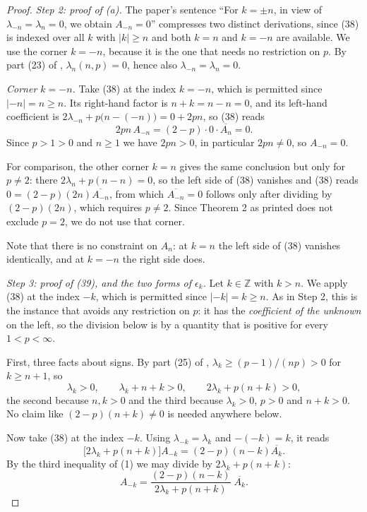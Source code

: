 \begin{proof}
\emph{Step 2: proof of (a).}  The paper's sentence ``For $k=\pm n$, in view of
$\lambda_{-n}=\lambda_n=0$, we obtain $A_{-n}=0$'' compresses two distinct
derivations, since (38) is indexed over all $k$ with $|k|\ge n$ and both $k=n$
and $k=-n$ are available.  We use the corner $k=-n$, because it is the one that
needs no restriction on $p$.  By part (23) of ,
$\lambda_n(n,p)=0$, hence also $\lambda_{-n}=\lambda_n=0$.

\emph{Corner $k=-n$.}  Take (38) at the index $k=-n$, which is permitted since
$|-n|=n\ge n$.  Its right-hand factor is $n+k=n-n=0$, and its left-hand
coefficient is $2\lambda_{-n}+p\bigl(n-(-n)\bigr)=0+2pn$, so (38) reads
\[
  2pn\,A_{-n}=(2-p)\cdot0\cdot\overline{A_{n}}=0 .
\]
Since $p>1>0$ and $n\ge1$ we have $2pn>0$, in particular $2pn\neq0$, so
$A_{-n}=0$.

For comparison, the other corner $k=n$ gives the same conclusion but only for
$p\neq2$: there $2\lambda_n+p(n-n)=0$, so the left side of (38) vanishes and
(38) reads $0=(2-p)(2n)\overline{A_{-n}}$, from which $\overline{A_{-n}}=0$
follows only after dividing by $(2-p)(2n)$, which requires $p\neq2$.  Since
Theorem 2 as printed does not exclude $p=2$, we do not use that corner.

Note that there is no constraint on $A_n$: at $k=n$ the left side of (38)
vanishes identically, and at $k=-n$ the right side does.

\emph{Step 3: proof of (39), and the two forms of $\epsilon_k$.}  Let
$k\in\mathbb{Z}$ with $k>n$.  We apply (38) at the index $-k$, which is
permitted since $|-k|=k\ge n$.  As in Step 2, this is the instance that avoids
any restriction on $p$: it has the \emph{coefficient of the unknown} on the
left, so the division below is by a quantity that is positive for every
$1<p<\infty$.

First, three facts about signs.  By part (25) of ,
$\lambda_k\ge(p-1)/(np)>0$ for $k\ge n+1$, so
\begin{equation}\tag{1}
  \lambda_k>0,\qquad \lambda_k+n+k>0,\qquad 2\lambda_k+p(n+k)>0,
\end{equation}
the second because $n,k>0$ and the third because $\lambda_k>0$, $p>0$ and
$n+k>0$.  No claim like $(2-p)(n+k)\neq0$ is needed anywhere below.

Now take (38) at the index $-k$.  Using $\lambda_{-k}=\lambda_k$ and
$-(-k)=k$, it reads
\begin{equation}\tag{2}
  \bigl[2\lambda_k+p(n+k)\bigr]A_{-k}=(2-p)(n-k)\overline{A_k} .
\end{equation}
By the third inequality of (1) we may divide by $2\lambda_k+p(n+k)$:
\begin{equation}\tag{3}
  A_{-k}=\frac{(2-p)(n-k)}{2\lambda_k+p(n+k)}\;\overline{A_k} .
\end{equation}


\end{proof}
